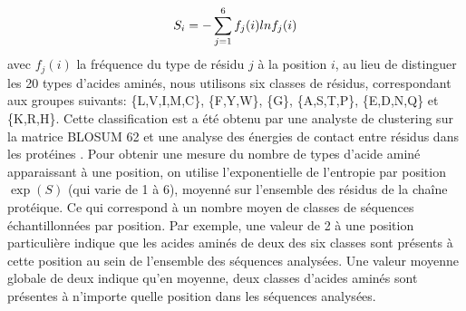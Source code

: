 \begin{equation} \label{eq:entropy}
  S_i = - \sum_{j=1}^6 f_j(i)lnf_j(i) \\
\end{equation} 
avec $f_j(i)$ la fréquence du type de résidu $j$ à la position $i$, au lieu de distinguer les 20 types d'acides aminés, nous utilisons six classes de résidus, correspondant aux groupes suivants: \{L,V,I,M,C\}, \{F,Y,W\}, \{G\}, \{A,S,T,P\}, \{E,D,N,Q\} et \{K,R,H\}. Cette classification est a été obtenu par une analyste de clustering  sur la matrice BLOSUM 62 \label{eq:entropy} et une analyse  des énergies de contact entre résidus dans les protéines \cite{Launay07}. Pour obtenir une mesure du nombre de types d'acide aminé apparaissant à une position, on utilise l'exponentielle de l'entropie par position $\exp(S)$ (qui varie de 1 à 6), moyenné sur l'ensemble des résidus de la chaîne protéique. Ce qui correspond à un nombre moyen de classes de séquences échantillonnées par position. Par exemple, une valeur de 2 à une position particulière indique que les acides aminés de deux des six classes sont présents à cette position au sein de l'ensemble des séquences analysées. Une valeur moyenne globale de deux indique qu'en moyenne, deux classes d'acides aminés sont présentes à n'importe quelle position dans les séquences analysées.


\clearpage


